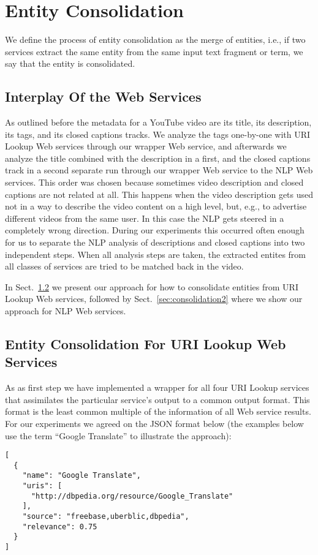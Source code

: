\documentclass{acm_proc_article-sp}
\begin{document}
\section{Entity Consolidation}\label{sec:consolidation}
We define the process of entity consolidation as the merge of entities, i.e., if two services extract the same entity from the same input text fragment or term, we say that the entity is consolidated.

\subsection{Interplay Of the Web Services}\label{sec:interplay}
As outlined before the metadata for a YouTube video are its title, its description, its tags, and its closed captions tracks. We analyze the tags one-by-one with URI Lookup Web services through our wrapper Web service, and afterwards we analyze the title combined with the description in a first, and the closed captions track in a second separate run through our wrapper Web service to the NLP Web services. This order was chosen because sometimes video description and closed captions are not related at all. This happens when the video description gets used not in a way to describe the video content on a high level, but, e.g., to advertise different videos from the same user. In this case the NLP gets steered in a completely wrong direction. During our experiments this occurred often enough for us to separate the NLP analysis of descriptions and closed captions into two independent steps. When all analysis steps are taken, the extracted entites from all classes of services are tried to be matched back in the video.

In Sect.~\ref{sec:consolidation1} we present our approach for how to consolidate entities from URI Lookup Web services, followed by Sect.~\ref{sec:consolidation2} where we show our approach for NLP Web services.

\subsection{Entity Consolidation For URI Lookup Web Services}\label{sec:consolidation1}
As as first step we have implemented a wrapper for all four URI Lookup services that assimilates the particular service's output to a common output format. This format is the least common multiple of the information of all Web service results. For our experiments we agreed on the JSON format below (the examples below use the term ``Google Translate'' to illustrate the approach): 
\begin{lstlisting}
[
  {
    "name": "Google Translate",
    "uris": [
      "http://dbpedia.org/resource/Google_Translate"
    ],
    "source": "freebase,uberblic,dbpedia",
    "relevance": 0.75
  }
]
\end{lstlisting} 
\end{document}

